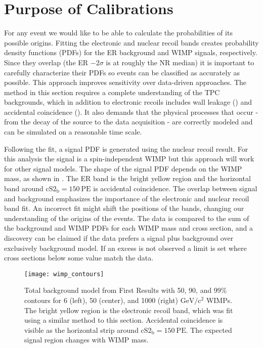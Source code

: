 \section{Purpose of Calibrations}
\label{sec:er_nr_calibrations_purpose}
For any event we would like to be able to calculate the probabilities of its possible origins.  Fitting the electronic and nuclear
recoil bands creates probability density functions (PDFs) for the ER background and WIMP signals, respectively.  Since they overlap
(the ER $-2\sigma$ is at roughly the NR median) it is important to carefully characterize their PDFs so events can be classified
as accurately as possible.  This approach improves sensitivity over
data-driven approaches.  The method in this section requires a complete understanding of the TPC
backgrounds, which
in addition to electronic recoils includes wall leakage () and accidental
coincidence ().  It also demands that
the physical processes that occur - from the decay of the source to the data acquisition - are correctly modeled and can be
simulated on a reasonable time scale.

Following the fit, a signal PDF is generated using the nuclear recoil result.  For this analysis the signal is a spin-independent WIMP but
this approach will work for other signal models.  The shape of the signal PDF depends on the WIMP mass, as shown in
.  The ER band is the bright yellow region and the horizontal band around
$\mathrm{cS2_b} = 150\ \mathrm{PE}$ is
accidental coincidence.  The overlap between signal and background emphasizes the importance of the electronic and nuclear recoil band
fit.  An incorrect fit might shift the positions of the bands, changing our understanding of the origins of the events.  The data is
compared to the sum of the background and WIMP PDFs for each WIMP mass and cross section, and a discovery can be claimed if the data
prefers a signal plus background over exclusively background model.  If an excess is not observed a limit is set where
cross sections below some value match the data.

\begin{figure}
\centering
\texttt{[image: wimp\_contours]}
\caption[Total background model from First Results with 50, 90, and 99\% contours for 6, 50, and 1000
$\mathrm{GeV/c^2}$ WIMPs.]{Total background model from First Results with 50, 90, and 99\% contours for 6 (left), 50 (center), and 1000
(right) $\mathrm{GeV/c^2}$ WIMPs.  The bright yellow region is the
electronic recoil band, which was fit using a similar method to this section.  Accidental coincidence is visible as the horizontal strip
around $\mathrm{cS2_b} = 150\ \mathrm{PE}$.  The expected signal region changes with WIMP mass.}
\label{fig:er_nr_calibrations_purpose_wimp_contours}
\end{figure}




